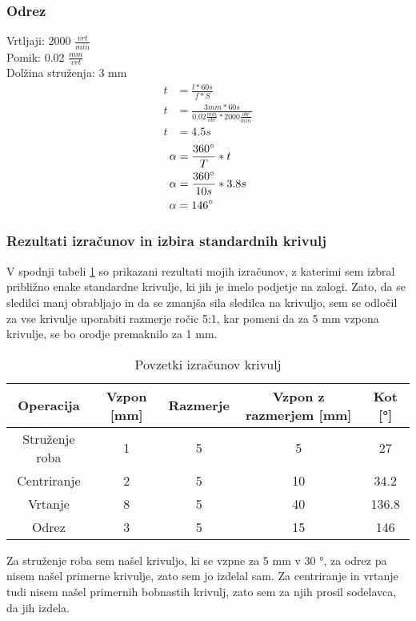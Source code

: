 \subsubsection{Odrez}
\label{izracun_odreza}
Vrtljaji: 2000 \( \frac{vrt}{min} \) \\
Pomik: 0.02 \( \frac{mm}{vrt} \) \\
Dolžina struženja: 3 mm
\begin{equation}
	\begin{split}
		t &= \frac{l*60s}{f*S} \\
		t &= \frac{3mm*60s}{0.02\frac{mm}{obr}*2000\frac{obr}{min}} \\
		t &= 4.5 s
	\end{split}
\end{equation}
\begin{equation}
	\begin{split}
		\alpha &= \frac{360\degree}{T} * t \\
		\alpha &= \frac{360\degree}{10s} * 3.8 s\\
		\alpha &= 146\degree
	\end{split}
\end{equation}

\subsubsection{Rezultati izračunov in izbira standardnih krivulj}
V spodnji tabeli \ref{Tabela rezultatov} so prikazani
rezultati mojih izračunov, z katerimi sem izbral približno
enake standardne krivulje, ki jih je imelo podjetje na zalogi.
Zato, da se sledilci manj obrabljajo in da se zmanjša sila sledilca
na krivuljo, sem se odločil za vse krivulje uporabiti razmerje ročic
5:1, kar pomeni da za 5 mm vzpona krivulje, se bo orodje premaknilo za 1 mm.

\begin{table}[H]
	\caption{Povzetki izračunov krivulj}
	\label{Tabela rezultatov}
	\begin{center}
		\begin{tabular}{|c|c|c|c|c|}
			\hline
			Operacija      & Vzpon [mm] & Razmerje & Vzpon z razmerjem [mm] & Kot [°] \\
			\hline
			Struženje roba & 1          & 5        & 5                      & 27      \\
			\hline
			Centriranje    & 2          & 5        & 10                     & 34.2    \\
			\hline
			Vrtanje        & 8          & 5        & 40                     & 136.8   \\
			\hline
			Odrez          & 3          & 5        & 15                     & 146     \\
			\hline
		\end{tabular}
	\end{center}
\end{table}

Za struženje roba sem našel krivuljo, ki se vzpne za 5 mm v 30 °,
za odrez pa nisem našel primerne krivulje, zato sem jo izdelal sam.
Za centriranje in vrtanje tudi nisem našel primernih bobnastih krivulj,
zato sem za njih prosil sodelavca, da jih izdela.